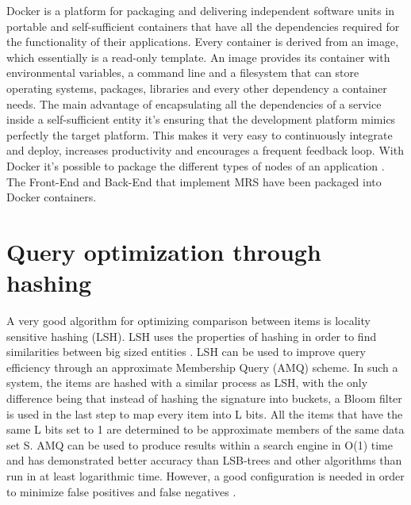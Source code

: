 Docker is a platform for packaging and delivering independent software units in portable and self-sufficient containers that have all the dependencies required for the functionality of their applications. Every container is derived from an image, which essentially is a read-only template. An image provides its container with environmental variables, a command line and a filesystem that can store operating systems, packages, libraries and every other dependency a container needs. The main advantage of encapsulating all the dependencies of a service inside a self-sufficient entity it’s ensuring that the development platform mimics perfectly the target platform. This makes it very easy to continuously integrate and deploy, increases productivity and encourages a frequent feedback loop. With Docker it's possible to package the different types of nodes of an application \cite{docker}. The Front-End and Back-End that implement \ac{MRS} have been packaged into Docker containers.

\newpage
\section{Query optimization through hashing}
A very good algorithm for optimizing comparison between items is locality sensitive hashing (LSH). LSH uses the properties of hashing in order to find similarities between big sized entities \cite{lsh}.
LSH can be used to improve query efficiency through an approximate Membership Query (AMQ) scheme. In such a system, the items are hashed with a similar process as LSH, with the only difference being that instead of hashing the signature into buckets, a Bloom filter is used in the last step to map every item into L bits. All the items that have the same L bits set to 1 are determined to be approximate members of the same data set S. AMQ can be used to produce results within a search engine in O(1) time and has demonstrated better accuracy than LSB-trees and other algorithms than run in at least logarithmic time. However, a good configuration is needed in order to minimize false positives and false negatives \cite{amq}.









